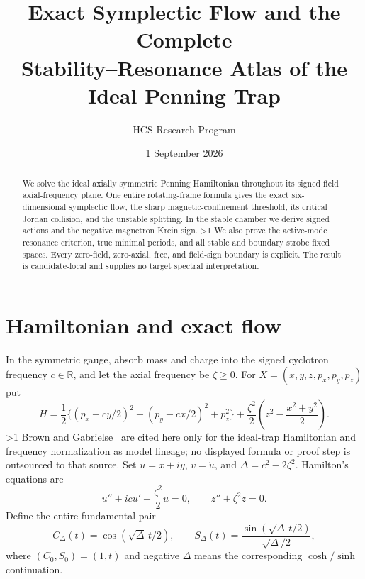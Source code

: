 \documentclass[10pt]{article}
\title{Exact Symplectic Flow and the Complete\\
Stability--Resonance Atlas of the Ideal Penning Trap}
\author{HCS Research Program}
\date{1 September 2026}
\providecommand{\CRevisionRound}{2}
\begin{document}
\maketitle

\begin{abstract}
We solve the ideal axially symmetric Penning Hamiltonian throughout its signed
field--axial-frequency plane.  One entire rotating-frame formula gives the
exact six-dimensional symplectic flow, the sharp magnetic-confinement
threshold, its critical Jordan collision, and the unstable splitting.  In the
stable chamber we derive signed actions and the negative magnetron Krein sign.
\ifnum\CRevisionRound>1
We also prove the active-mode resonance criterion, true minimal periods, and
all stable and boundary strobe fixed spaces.
\fi
Every zero-field, zero-axial, free, and field-sign boundary is explicit.  The
result is candidate-local and supplies no target spectral interpretation.
\end{abstract}

\section{Hamiltonian and exact flow}
In the symmetric gauge, absorb mass and charge into the signed cyclotron
frequency $c\in\mathbb R$, and let the axial frequency be $\zeta\geq0$.  For
$X=(x,y,z,p_x,p_y,p_z)$ put
\begin{equation}
 H=\frac12\{(p_x+cy/2)^2+(p_y-cx/2)^2+p_z^2\}
   +\frac{\zeta^2}{2}\left(z^2-\frac{x^2+y^2}{2}\right).
 \tag{1}
\end{equation}
\ifnum\CRevisionRound>1
Brown and Gabrielse~\cite{BrownGabrielse1982} are cited here only for the
ideal-trap Hamiltonian and frequency normalization as model lineage; no
displayed formula or proof step is outsourced to that source.
\fi
Set $u=x+iy$, $v=\dot u$, and $\Delta=c^2-2\zeta^2$.  Hamilton's equations are
\begin{equation}
 u''+icu'-\frac{\zeta^2}{2}u=0,\qquad z''+\zeta^2z=0. \tag{2}
\end{equation}
Define the entire fundamental pair
\[
 C_\Delta(t)=\cos(\sqrt\Delta\,t/2),\qquad
 S_\Delta(t)=\frac{\sin(\sqrt\Delta\,t/2)}{\sqrt\Delta/2},
\]
where $(C_0,S_0)=(1,t)$ and negative $\Delta$ means the corresponding
$\cosh/\sinh$ continuation.
\end{document}
